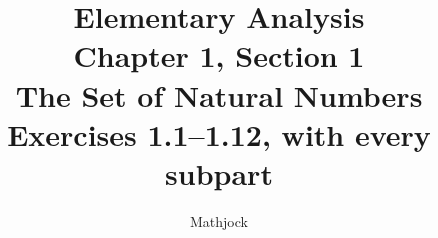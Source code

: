 
\title{\textbf{Elementary Analysis}\\[0.3em]
Chapter 1, Section 1\\[0.3em]
\large The Set of Natural Numbers\\
Exercises 1.1--1.12, with every subpart}
\author{Mathjock}
\date{}

\maketitle
\bookinfo
\tableofcontents
\clearpage


